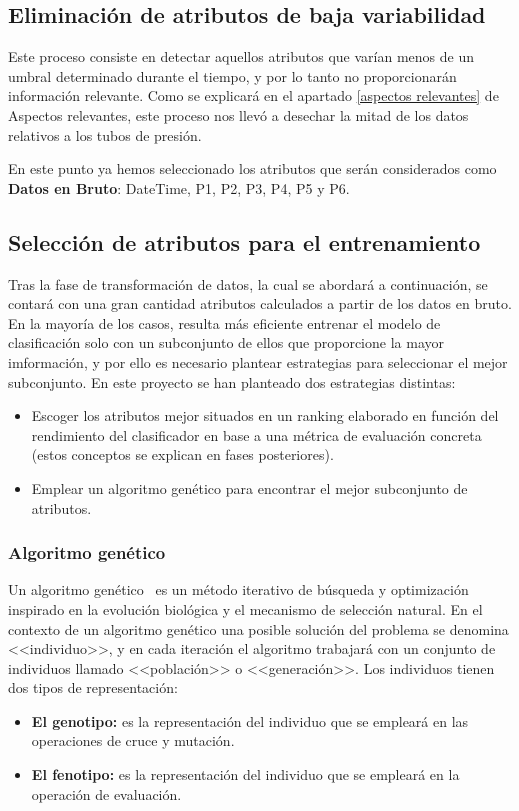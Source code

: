 \subsection{Eliminación de atributos de baja variabilidad}

Este proceso consiste en detectar aquellos atributos que varían menos de un umbral determinado durante el tiempo, y por lo tanto no proporcionarán información relevante. Como se explicará en el apartado \ref{aspectos relevantes} de Aspectos relevantes, este proceso nos llevó a desechar la mitad de los datos relativos a los tubos de presión. 

En este punto ya hemos seleccionado los atributos que serán considerados como \textbf{Datos en Bruto}: DateTime, P1, P2, P3, P4, P5 y P6.

\subsection{Selección de atributos para el entrenamiento}

Tras la fase de transformación de datos, la cual se abordará a continuación, se contará con una gran cantidad atributos calculados a partir de los datos en bruto. En la mayoría de los casos, resulta más eficiente entrenar el modelo de clasificación solo con un subconjunto de ellos que proporcione la mayor imformación, y por ello es necesario plantear estrategias para seleccionar el mejor subconjunto. En este proyecto se han planteado dos estrategias distintas: 

\begin{itemize}
	\item Escoger los atributos mejor situados en un ranking elaborado en función del rendimiento del clasificador en base a una métrica de evaluación concreta (estos conceptos se explican en fases posteriores). 
	\item Emplear un algoritmo genético para encontrar el mejor subconjunto de atributos. 
\end{itemize}

\subsubsection{Algoritmo genético}

Un algoritmo genético~\cite{koza92} es un método iterativo de búsqueda y optimización inspirado en la evolución biológica y el mecanismo de selección natural. En el contexto de un algoritmo genético una posible solución del problema se denomina <<individuo>>, y en cada iteración el algoritmo trabajará con un conjunto de individuos llamado <<población>> o <<generación>>. Los individuos tienen dos tipos de representación: 
\begin{itemize}
	\item \textbf{El genotipo:} es la representación del individuo que se empleará en las operaciones de cruce y mutación. 
	\item \textbf{El fenotipo:} es la representación del individuo que se empleará en la operación de evaluación. 
\end{itemize}

